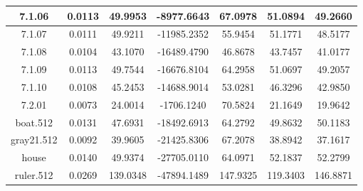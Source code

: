\begin{table}[H]
\begin{tabular}{|c|cccc|cc|}
7.1.06 & \multicolumn{1}{c|}{0.0113} & \multicolumn{1}{c|}{49.9953} & \multicolumn{1}{c|}{-8977.6643} & 67.0978 & \multicolumn{1}{c|}{51.0894} & 49.2660 \\ \hline
7.1.07 & \multicolumn{1}{c|}{0.0111} & \multicolumn{1}{c|}{49.9211} & \multicolumn{1}{c|}{-11985.2352} & 55.9454 & \multicolumn{1}{c|}{51.1771} & 48.5177 \\ \hline
7.1.08 & \multicolumn{1}{c|}{0.0104} & \multicolumn{1}{c|}{43.1070} & \multicolumn{1}{c|}{-16489.4790} & 46.8678 & \multicolumn{1}{c|}{43.7457} & 41.0177 \\ \hline
7.1.09 & \multicolumn{1}{c|}{0.0113} & \multicolumn{1}{c|}{49.7544} & \multicolumn{1}{c|}{-16676.8104} & 64.2958 & \multicolumn{1}{c|}{51.0697} & 49.2057 \\ \hline
7.1.10 & \multicolumn{1}{c|}{0.0108} & \multicolumn{1}{c|}{45.2453} & \multicolumn{1}{c|}{-14688.9014} & 53.0281 & \multicolumn{1}{c|}{46.3296} & 42.9850 \\ \hline
7.2.01 & \multicolumn{1}{c|}{0.0073} & \multicolumn{1}{c|}{24.0014} & \multicolumn{1}{c|}{-1706.1240} & 70.5824 & \multicolumn{1}{c|}{21.1649} & 19.9642 \\ \hline
boat.512 & \multicolumn{1}{c|}{0.0131} & \multicolumn{1}{c|}{47.6931} & \multicolumn{1}{c|}{-18492.6913} & 64.2792 & \multicolumn{1}{c|}{49.8632} & 50.1183 \\ \hline
gray21.512 & \multicolumn{1}{c|}{0.0092} & \multicolumn{1}{c|}{39.9605} & \multicolumn{1}{c|}{-21425.8306} & 67.2078 & \multicolumn{1}{c|}{38.8942} & 37.1617 \\ \hline
house & \multicolumn{1}{c|}{0.0140} & \multicolumn{1}{c|}{49.9374} & \multicolumn{1}{c|}{-27705.0110} & 64.0971 & \multicolumn{1}{c|}{52.1837} & 52.2799 \\ \hline
ruler.512 & \multicolumn{1}{c|}{0.0269} & \multicolumn{1}{c|}{139.0348} & \multicolumn{1}{c|}{-47894.1489} & 147.9325 & \multicolumn{1}{c|}{119.3403} & 146.8871 \\ \hline
\end{tabular}
\end{table}